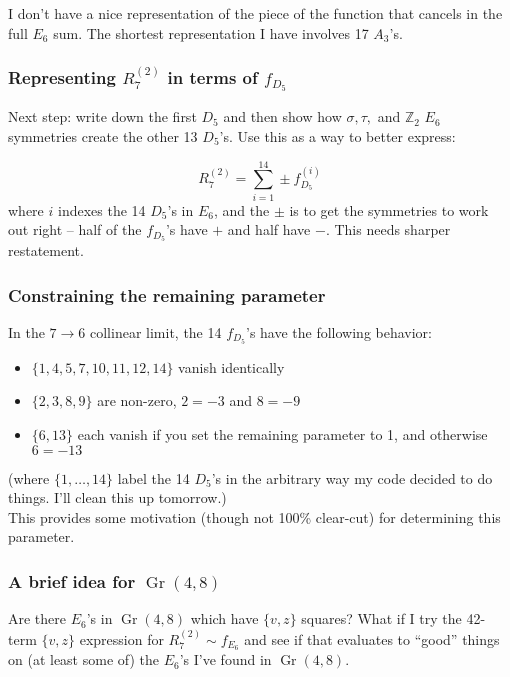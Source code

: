 \documentclass[12pt]{article}
\DeclareMathOperator{\Gr}{Gr}
\def\a{\mathcal{A}}
\def\fd5{f_{D_5}}
\def\a2{A_2}
\def\a3{A_3}
\def\d5{D_5}
\def\e6{E_6}
\def\r27{R^{(2)}_7}
\begin{document}
I don't have a nice representation of the piece of the function that cancels in the full $\e6$ sum. The shortest representation I have involves 17 $\a3$'s. 

\subsubsection*{Representing $\r27$ in terms of $\fd5$}

Next step: write down the first $\d5$ and then show how $\sigma, \tau,$ and $\mathbb{Z}_2$ $\e6$ symmetries create the other 13 $\d5$'s. Use this as a way to better express:

\begin{equation}
	\r27 = \sum_{i=1}^{14} \pm \fd5^{(i)}
\end{equation}
where $i$ indexes the 14 $\d5$'s in $\e6$, and the $\pm$ is to get the symmetries to work out right -- half of the $\fd5$'s have $+$ and half have $-$. This needs sharper restatement. 

\subsubsection*{Constraining the remaining parameter}

In the $7\to6$ collinear limit, the 14 $\fd5$'s have the following behavior:

\begin{itemize}
	\item $\{1,4,5,7,10,11,12,14\}$ vanish identically
	\item $\{2,3,8,9\}$ are non-zero, $2=-3$ and $8=-9$
	\item $\{6,13\}$ each vanish if you set the remaining parameter to 1, and otherwise $6=-13$
\end{itemize}
(where $\{1,\ldots,14\}$ label the 14 $\d5$'s in the arbitrary way my code decided to do things. I'll clean this up tomorrow.)\\ 

This provides some motivation (though not 100\% clear-cut) for determining this parameter. 

\subsubsection*{A brief idea for $\Gr(4,8)$}

Are there $\e6$'s in $\Gr(4,8)$ which have $\{v,z\}$ squares? What if I try the 42-term $\{v,z\}$ expression for $\r27 \sim f_{E_6}$ and see if that evaluates to ``good'' things on (at least some of) the $\e6$'s I've found in $\Gr(4,8)$.
\end{document}
